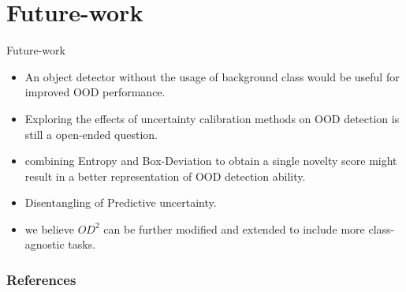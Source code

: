 \documentclass[10pt, aspectratio=169]{beamer}
\begin{document}
\section{Future-work}
\begin{frame}[allowframebreaks]{Future-work}
    \begin{itemize}
        \item An object detector without the usage of background class would be useful for improved OOD performance.
        \item Exploring the effects of uncertainty calibration methods \cite{GuoCalibration2017} on OOD detection is still a open-ended question.
        \item combining Entropy and Box-Deviation to obtain a single novelty score might result in a better representation of OOD detection ability.
        \item Disentangling of Predictive uncertainty.
        \item we believe $OD^2$ can be further modified and extended to include more class-agnostic tasks.
    \end{itemize}
\end{frame}

\begin{frame}[allowframebreaks]
    \frametitle{References}
    
    {\small
}
\end{frame}
\end{document}
